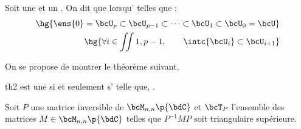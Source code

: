 \documentclass[a4paper,french,bookmarks]{article}
\begin{document}
    \begin{definition}{}{}
        Soit \hg{$\bcU$} une  et  un . On dit que  lorsqu' telles que :
        \begin{align*}
            \hg{\ens{0} = \bcU_p \subset \bcU_{p-1} \subset \dots \subset \bcU_1 \subset \bcU_0 = \bcU}\\
            \hg{\forall i \in \iint{1, p-1},\qquad \intc{\bcU_i} \subset \bcU_{i+1}}
        \end{align*}
    \end{definition}
    On se propose de montrer le théorème suivant.
    
    \begin{theorem}{}{th2}
        \hg{$\bcU$} est une  si et seulement s' telle que, .
    \end{theorem}
    
    Soit $P$ une matrice inversible de $\bcM_{n, n}\p{\bdC}$ et $\bcT_P$ l'ensemble des matrices $M \in \bcM_{n, n}\p{\bdC}$ telles que $P^{-1}MP$ soit triangulaire supérieure.
    
\end{document}
